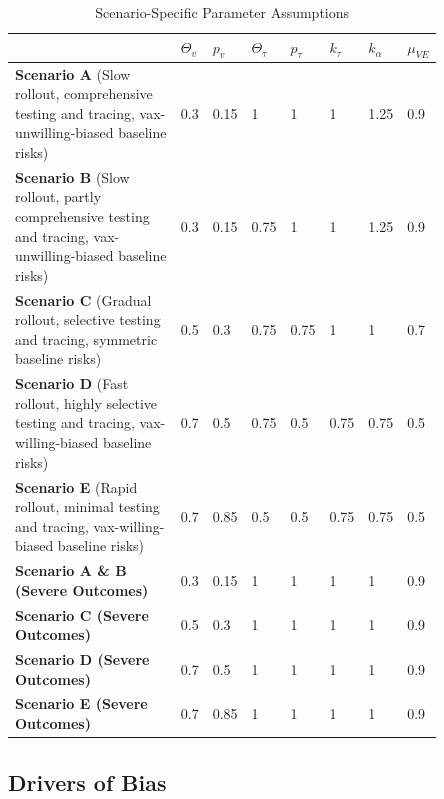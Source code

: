 \documentclass[12pt]{article}
\begin{document}
\begin{table}[H]
	\begin{center}
		\caption{Scenario-Specific Parameter Assumptions}
		\begin{tabular}{||p{0.5\linewidth}||p{0.05\linewidth}|p{0.05\linewidth}|p{0.05\linewidth}|p{0.05\linewidth}|p{0.05\linewidth}|p{0.05\linewidth}|p{0.05\linewidth}||}
			\hline \hline
			& $\Theta_{v}$ & $p_v$ & $\Theta_{\tau}$ & $p_\tau$ & $k_\tau$ & $k_\alpha$ & $\mu_{VE}$ \\
			\hline \hline
			\textbf{Scenario A} (Slow rollout, comprehensive testing and tracing, vax-unwilling-biased baseline risks) & 0.3 & 0.15 & 1 & 1 & 1 & 1.25 & 0.9 \\
			\hline
			\textbf{Scenario B} (Slow rollout, partly comprehensive testing and tracing, vax-unwilling-biased baseline risks) & 0.3 & 0.15 & 0.75 & 1 & 1 & 1.25 & 0.9 \\
			\hline
			\textbf{Scenario C} (Gradual rollout, selective testing and tracing, symmetric baseline risks) & 0.5 & 0.3 & 0.75 & 0.75 & 1 & 1 & 0.7 \\
			\hline
			\textbf{Scenario D} (Fast rollout, highly selective testing and tracing, vax-willing-biased baseline risks) & 0.7 & 0.5 & 0.75 & 0.5 & 0.75 & 0.75 & 0.5\\
			\hline
			\textbf{Scenario E} (Rapid rollout, minimal testing and tracing, vax-willing-biased baseline risks) & 0.7 & 0.85 & 0.5 & 0.5 & 0.75 & 0.75 & 0.5 \\
			\hline
			\textbf{Scenario A \& B (Severe Outcomes)} & 0.3 & 0.15 & 1 & 1 & 1 & 1 & 0.9 \\
			\hline
			\textbf{Scenario C (Severe Outcomes)} & 0.5 & 0.3 & 1 & 1 & 1 & 1 & 0.9 \\
			\hline
			\textbf{Scenario D (Severe Outcomes)} & 0.7 & 0.5 & 1 & 1 & 1 & 1 & 0.9 \\
			\hline
			\textbf{Scenario E (Severe Outcomes)} & 0.7 & 0.85 & 1 & 1 & 1 & 1 & 0.9 \\
			\hline \hline
		\end{tabular}
	\end{center}
\end{table}

\subsection{Drivers of Bias} 
\end{document}
